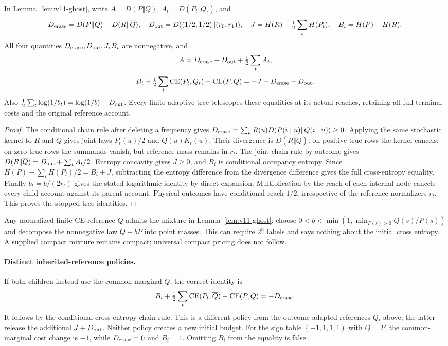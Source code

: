 \begin{lemma}
\label{lem:v11-account}
In Lemma~\ref{lem:v11-ghost}, write $A=D(P\Vert Q)$,
$A_t=D(P_t\Vert Q_t)$, and
\[
 D_{\rm erase}=D(P\Vert Q)-D(R\Vert\overline Q),\quad
 D_{\rm out}=D((1/2,1/2)\Vert(r_0,r_1)),\quad
 J=H(R)-\tfrac12\sum_tH(P_t),\quad B_i=H(P)-H(R).
\]
All four quantities $D_{\rm erase},D_{\rm out},J,B_i$ are nonnegative, and
\[
 A=D_{\rm erase}+D_{\rm out}+\tfrac12\sum_t A_t,
\]
\[
 B_i+\tfrac12\sum_t\operatorname{CE}(P_t,Q_t)-\operatorname{CE}(P,Q)
 =-J-D_{\rm erase}-D_{\rm out}.
\]
Also $\tfrac12\sum_t\log(1/b_t)=\log(1/b)-D_{\rm out}$.
Every finite adaptive tree telescopes these equalities at its actual reaches, retaining
all full terminal costs and the original reference account.
\end{lemma}
\begin{proof}
The conditional chain rule after deleting a frequency gives
$D_{\rm erase}=\sum_uR(u)D(P(i\mid u)\Vert Q(i\mid u))\geq0$.
Applying the same stochastic kernel to $R$ and $\overline Q$ gives joint laws
$P_t(u)/2$ and $\overline Q(u)K_t(u)$. Their divergence is $D(R\Vert\overline Q)$:
on positive true rows the kernel cancels; on zero true rows the summands vanish,
but reference mass remains in $r_t$. The joint chain rule by outcome gives
$D(R\Vert\overline Q)=D_{\rm out}+\sum_t A_t/2$.
Entropy concavity gives $J\geq0$, and $B_i$ is conditional occupancy entropy.
Since $H(P)-\sum_tH(P_t)/2=B_i+J$, subtracting the entropy difference from the
divergence difference gives the full cross-entropy equality. Finally
$b_t=b/(2r_t)$ gives the stated logarithmic identity by direct expansion.
Multiplication by the reach of each internal node cancels every child account against
its parent account. Physical outcomes have conditional reach $1/2$, irrespective of
the reference normalizers $r_t$. This proves the stopped-tree identities.
\end{proof}

Any normalized finite-CE reference $Q$ admits the mixture in
Lemma~\ref{lem:v11-ghost}: choose
$0<b<\min(1,\min_{P(s)>0}Q(s)/P(s))$ and decompose the nonnegative law $Q-bP$
into point masses. This can require $2^n$ labels and says nothing about the initial
cross entropy. A supplied compact mixture remains compact; universal compact pricing
does not follow.

\paragraph{Distinct inherited-reference policies.}
If both children instead use the common marginal $\overline Q$, the correct identity is
\[
 B_i+\tfrac12\sum_t\operatorname{CE}(P_t,\overline Q)
 -\operatorname{CE}(P,Q)=-D_{\rm erase}.
\]
It follows by the conditional cross-entropy chain rule. This is a different policy
from the outcome-adapted references $Q_t$ above; the latter release the additional
$J+D_{\rm out}$. Neither policy creates a new initial budget. For the sign table
$(-1,1,1,1)$ with $Q=P$, the common-marginal cost change is $-1$, while
$D_{\rm erase}=0$ and $B_i=1$. Omitting $B_i$ from the equality is false.

